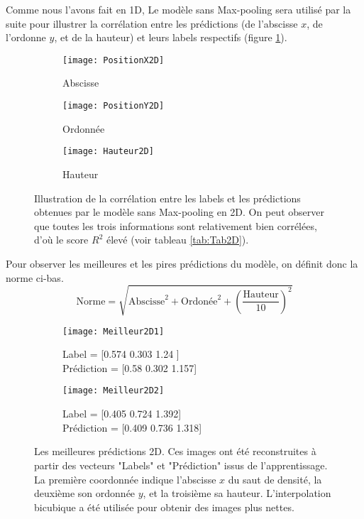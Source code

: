     Comme nous l'avons fait en 1D, Le modèle sans Max-pooling sera utilisé par la suite pour illustrer la corrélation entre les prédictions (de l'abscisse $x$, de l'ordonne $y$, et de la hauteur) et leurs labels respectifs (figure \ref{fig:Illustration2D}).
    \begin{figure}[!h]
    \begin{subfigure}{.33\textwidth}
    \centering
    \texttt{[image: PositionX2D]}  
    \caption[PosX2D]{Abscisse}
    \end{subfigure}
    \begin{subfigure}{.33\textwidth}
    \centering
    \texttt{[image: PositionY2D]}  
    \caption[PosY2D]{Ordonnée}
    \end{subfigure}
    \begin{subfigure}{.33\textwidth}
    \centering
    \texttt{[image: Hauteur2D]}  
    \caption[H2D]{Hauteur}
    \end{subfigure}
    
     \centering
    \decoRule
    \caption[Illustration 2D]{Illustration de la corrélation entre les labels et les prédictions obtenues par le modèle sans Max-pooling en 2D. On peut observer que toutes les trois informations sont relativement bien corrélées, d'où le score $R^2$ élevé (voir tableau \ref{tab:Tab2D}).}
    \label{fig:Illustration2D}
    \end{figure}
    
    Pour observer les meilleures et les pires prédictions du modèle, on définit donc la norme ci-bas. $$ \text{Norme} = \sqrt{\text{Abscisse}^2 + \text{Ordonée}^2 + \left( \frac{\text{Hauteur}}{10} \right)^2}$$
    
    \begin{figure}[!h]
    \begin{subfigure}{.5\textwidth}
    \centering
    \texttt{[image: Meilleur2D1]}  
    \caption[Meilleur2D1]{Label = [0.574 0.303 1.24 ] \\ Prédiction = [0.58  0.302 1.157]}
    \end{subfigure}
    \begin{subfigure}{.5\textwidth}
    \centering
    \texttt{[image: Meilleur2D2]}  
    \caption[Meilleur2D2]{Label = [0.405 0.724 1.392]  \\  Prédiction = [0.409 0.736 1.318]}
    \end{subfigure}
    
     \centering
    \decoRule
    \caption[Meilleur 2D]{Les meilleures prédictions 2D. Ces images ont été reconstruites à partir des vecteurs "Labels" et "Prédiction" issus de l'apprentissage. La première coordonnée indique l'abscisse $x$ du saut de densité, la deuxième son ordonnée $y$, et la troisième sa hauteur. L'interpolation bicubique a été utilisée pour obtenir des images plus nettes.}
    \label{fig:Meilleur2D}
    \end{figure}

